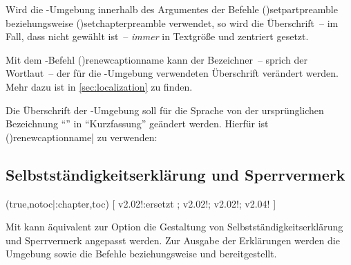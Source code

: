 \begin{DeclareEntity*}{}
\begin{DeclareEntity*}{}
\begin{DeclareEntity*}{}
\begin{Declaration}
\begin{Declaration}
\begin{Declaration}
\begin{Declaration}
\begin{Declaration}
\begin{Declaration}
\begin{Declaration}
Wird die -Umgebung innerhalb des Argumentes der Befehle 
\Macro(){setpartpreamble} beziehungsweise 
\Macro(){setchapterpreamble} verwendet, so wird die 
Überschrift~-- im Fall, dass nicht  gewählt ist~-- 
\emph{immer} in Textgröße und zentriert gesetzt.
\end{Declaration}
\end{Declaration}
\end{Declaration}
\end{Declaration}
\end{Declaration}
\end{Declaration}
\end{Declaration}



Mit dem \KOMAScript-Befehl \Macro(){renewcaptionname}
kann der Bezeichner~-- sprich der Wortlaut~-- der für die 
-Umgebung verwendeten Überschrift verändert werden. Mehr 
dazu ist in \autoref{sec:localization} zu finden.
%
\begin{Example}
Die Überschrift der -Umgebung soll für die Sprache 
 von der ursprünglichen Bezeichnung \enquote{\abstractname} in 
\enquote{Kurzfassung} geändert werden. Hierfür ist 
\Macro(){renewcaptionname|}
zu verwenden:%
\begin{Code}
\end{Code}
\end{Example}
%



\subsection{%
  Selbstständigkeitserklärung und Sperrvermerk%
}

\begin{Declaration}
  {}
  (true,notoc|:chapter,toc)
[%
  v2.02!:ersetzt ;%
  v2.02!;%
  v2.02!;%
  v2.04!%
]
\printdeclarationlist

Mit  kann äquivalent zur Option  die 
Gestaltung von Selbstständigkeitserklärung und Sperrvermerk angepasst werden.
Zur Ausgabe der Erklärungen werden die Umgebung  
sowie die Befehle  beziehungsweise  und 
 bereitgestellt. 


\end{Declaration}
\end{DeclareEntity*}
\end{DeclareEntity*}
\end{DeclareEntity*}
